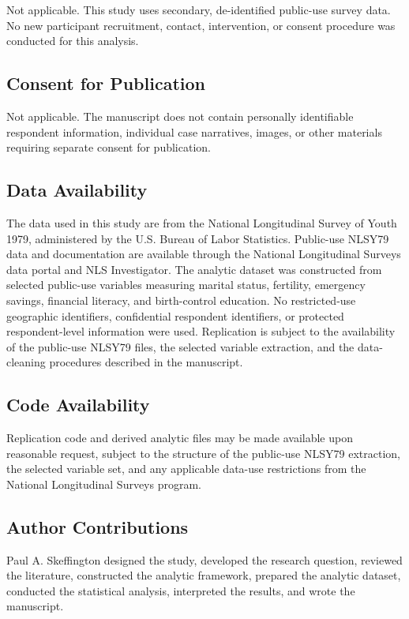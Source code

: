 \documentclass[12pt]{article}
\begin{document}
Not applicable. This study uses secondary, de-identified public-use survey data. No new participant recruitment, contact, intervention, or consent procedure was conducted for this analysis.

\subsection*{Consent for Publication}

Not applicable. The manuscript does not contain personally identifiable respondent information, individual case narratives, images, or other materials requiring separate consent for publication.

\subsection*{Data Availability}

The data used in this study are from the National Longitudinal Survey of Youth 1979, administered by the U.S. Bureau of Labor Statistics. Public-use NLSY79 data and documentation are available through the National Longitudinal Surveys data portal and NLS Investigator. The analytic dataset was constructed from selected public-use variables measuring marital status, fertility, emergency savings, financial literacy, and birth-control education. No restricted-use geographic identifiers, confidential respondent identifiers, or protected respondent-level information were used. Replication is subject to the availability of the public-use NLSY79 files, the selected variable extraction, and the data-cleaning procedures described in the manuscript.

\subsection*{Code Availability}

Replication code and derived analytic files may be made available upon reasonable request, subject to the structure of the public-use NLSY79 extraction, the selected variable set, and any applicable data-use restrictions from the National Longitudinal Surveys program.

\subsection*{Author Contributions}

Paul A. Skeffington designed the study, developed the research question, reviewed the literature, constructed the analytic framework, prepared the analytic dataset, conducted the statistical analysis, interpreted the results, and wrote the manuscript.
\end{document}
